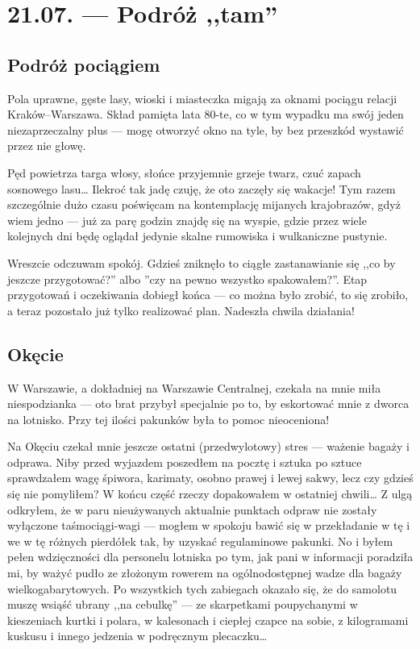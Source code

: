 \chapter*{21.07. --- Podróż ,,tam''}

\section*{Podróż pociągiem}

Pola uprawne, gęste lasy, wioski i miasteczka migają za oknami pociągu relacji Kraków--Warszawa. Skład pamięta lata 80-te, co w tym wypadku ma swój jeden niezaprzeczalny plus --- mogę otworzyć okno na tyle, by bez przeszkód wystawić przez nie głowę.

Pęd powietrza targa włosy, słońce przyjemnie grzeje twarz, czuć zapach sosnowego lasu… Ilekroć tak jadę czuję, że oto zaczęły się wakacje! Tym razem szczególnie dużo czasu poświęcam na kontemplację mijanych krajobrazów, gdyż wiem jedno --- już za parę godzin znajdę się na wyspie, gdzie przez wiele kolejnych dni będę oglądał jedynie skalne rumowiska i wulkaniczne pustynie.

Wreszcie odczuwam spokój. Gdzieś zniknęło to ciągłe zastanawianie się ,,co by jeszcze przygotować?'' albo ''czy na pewno wszystko spakowałem?''. Etap przygotowań i oczekiwania dobiegł końca --- co można było zrobić, to się zrobiło, a teraz pozostało już tylko realizować plan. Nadeszła chwila działania!

\section*{Okęcie}

W Warszawie, a dokładniej na Warszawie Centralnej, czekała na mnie miła niespodzianka --- oto brat przybył specjalnie po to, by eskortować mnie z dworca na lotnisko. Przy tej ilości pakunków była to pomoc nieoceniona!

Na Okęciu czekał mnie jeszcze ostatni (przedwylotowy) stres --- ważenie bagaży i odprawa. Niby przed wyjazdem poszedłem na pocztę i sztuka po sztuce sprawdzałem wagę śpiwora, karimaty, osobno prawej i lewej sakwy, lecz czy gdzieś się nie pomyliłem? W końcu część rzeczy dopakowałem w ostatniej chwili… Z ulgą odkryłem, że w paru nieużywanych aktualnie punktach odpraw nie zostały wyłączone taśmociągi-wagi --- mogłem w spokoju bawić się w przekładanie w tę i we w tę różnych pierdółek tak, by uzyskać regulaminowe pakunki. No i byłem pełen wdzięczności dla personelu lotniska po tym, jak pani w informacji poradziła mi, by ważyć pudło ze złożonym rowerem na ogólnodostępnej wadze dla bagaży wielkogabarytowych. Po wszystkich tych zabiegach okazało się, że do samolotu muszę wsiąść ubrany ,,na cebulkę'' --- ze skarpetkami poupychanymi w kieszeniach kurtki i polara, w kalesonach i ciepłej czapce na sobie, z kilogramami kuskusu i innego jedzenia w podręcznym plecaczku…


